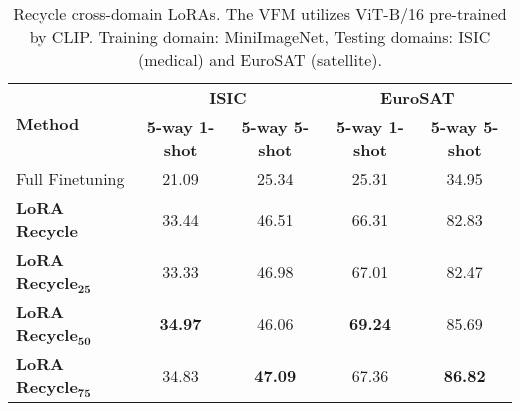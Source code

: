 \documentclass{article}
\begin{document}
\begin{table}[ht]
\centering
\caption{Recycle cross-domain LoRAs. The VFM utilizes ViT-B/16 pre-trained by CLIP. Training domain: MiniImageNet, Testing domains: ISIC (medical) and EuroSAT (satellite).}
\label{tab:cross_domain_loras}
\begin{tabular}{lcccc}
\toprule
\multirow{2}{*}{\textbf{Method}} & \multicolumn{2}{c}{\textbf{ISIC}} & \multicolumn{2}{c}{\textbf{EuroSAT}} \\
\cmidrule(lr){2-3} \cmidrule(lr){4-5}
& \textbf{5-way 1-shot} & \textbf{5-way 5-shot} & \textbf{5-way 1-shot} & \textbf{5-way 5-shot} \\
\midrule
Full Finetuning & 21.09 & 25.34 & 25.31 & 34.95 \\
\midrule
\textbf{LoRA Recycle} & 33.44 & 46.51 & 66.31 & 82.83 \\
\textbf{LoRA Recycle}$_{\mathbf{25}}$ & 33.33 & 46.98 & 67.01 & 82.47 \\
\textbf{LoRA Recycle}$_{\mathbf{50}}$ & \textbf{34.97} & 46.06 & \textbf{69.24} & 85.69 \\
\textbf{LoRA Recycle}$_{\mathbf{75}}$ & 34.83 & \textbf{47.09} & 67.36 & \textbf{86.82} \\
\bottomrule
\end{tabular}
\end{table}
\end{document}
